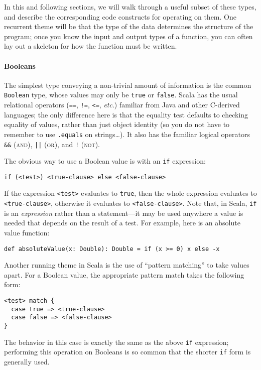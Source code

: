 In this and following sections, we will walk through a useful subset of these types, and describe the corresponding code constructs for operating on them. One recurrent theme will be that the type of the data determines the structure of the program; once you know the input and output types of a function, you can often lay out a skeleton for how the function must be written.

\paragraph{Booleans}
The simplest type conveying a non-trivial amount of information is the common \verb|Boolean| type, whose values may only be \verb|true| or \verb|false|. Scala has the usual relational operators (\verb|==|, \verb|!=|, \verb|<=|, \textit{etc}.) familiar from Java and other C-derived languages; the only difference here is that the equality test defaults to checking equality of values, rather than just object identity (so you do not have to remember to use \verb|.equals| on strings\ldots). It also has the familiar logical operators \verb|&&| (\textsc{and}), \verb-||- (\textsc{or}), and \verb|!| (\textsc{not}).

The obvious way to use a Boolean value is with an \verb|if| expression:
\begin{verbatim}
if (<test>) <true-clause> else <false-clause>
\end{verbatim}
If the expression \verb|<test>| evaluates to \verb|true|, then the whole expression evaluates to \verb|<true-clause>|, otherwise it evaluates to \verb|<false-clause>|. Note that, in Scala, \verb|if| is an \emph{expression} rather than a statement---it may be used anywhere a value is needed that depends on the result of a test. For example, here is an absolute value function:
\begin{verbatim}
def absoluteValue(x: Double): Double = if (x >= 0) x else -x
\end{verbatim}

Another running theme in Scala is the use of ``pattern matching'' to take values apart. For a Boolean value, the appropriate pattern match takes the following form:
\begin{verbatim}
<test> match {
  case true => <true-clause>
  case false => <false-clause>
}
\end{verbatim}
The behavior in this case is exactly the same as the above \verb|if| expression; performing this operation on Booleans is so common that the shorter \verb|if| form is generally used.

